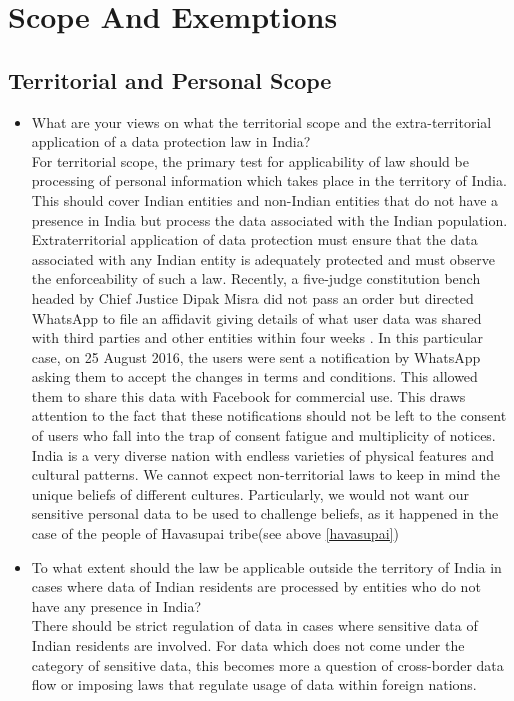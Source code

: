 \section{Scope And Exemptions}
\subsection{Territorial and Personal Scope}
\begin{itemize}
	\item What are your views on what the territorial scope and the extra-territorial application of a data protection law in India?
	\\
	For territorial scope, the primary test for applicability of law should be processing of personal information which takes place in the territory of India. This should cover Indian entities and non-Indian entities that do not have a presence in India but process the data associated with the Indian population.
	\\
	Extraterritorial application of data protection must ensure that the data associated with any Indian entity is adequately protected and must observe the enforceability of such a law. Recently, a five-judge constitution bench headed by Chief Justice Dipak Misra did not pass an order but directed WhatsApp to file an affidavit giving details of what user data was shared with third parties and other entities within four weeks \cite{whatuserthird}. In this particular case, on 25 August 2016, the users were sent a notification by WhatsApp asking them to accept the changes in terms and conditions. This allowed them to share this data with Facebook for commercial use. This draws attention to the fact that these notifications should not be left to the consent of users who fall into the trap of consent fatigue and multiplicity of notices.
	\\
	India is a very diverse nation with endless varieties of physical features and cultural patterns. We cannot expect non-territorial laws to keep in mind the unique beliefs of different cultures. Particularly, we would not want our sensitive personal data to be used to challenge beliefs, as it happened in the case of the people of Havasupai tribe(see above \ref{havasupai}) \cite{havasupai1,havasupai2}
	\item To what extent should the law be applicable outside the territory of India in cases where data of Indian residents are processed by entities who do not have any presence in India?
	\\
	There should be strict regulation of data in cases where sensitive data of Indian residents are involved. For data which does not come under the category of sensitive data, this becomes more a question of cross-border data flow or imposing laws that regulate usage of data within foreign nations. 

\end{itemize}

